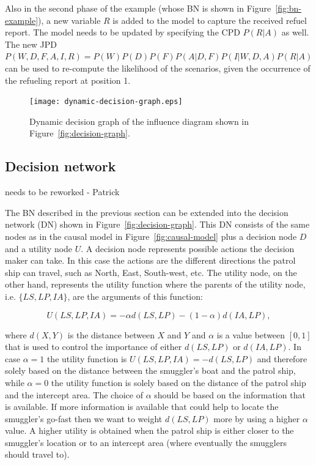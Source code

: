 \documentclass[conference]{IEEEtran}
\begin{document}
Also in the second phase of the example (whose BN is shown in Figure~\ref{fig:bn-example}), a new variable $R$ is added to the model to capture the received refuel report. The model needs to be updated by specifying the CPD $P(R|A)$ as well. The new JPD $P(W,D,F,A,I,R) = P(W)P(D)P(F)P(A|D,F)P(I|W,D,A)P(R|A)$ can be used to re-compute the likelihood of the scenarios, given the occurrence of the refueling report at position 1.


\begin{figure}[!t]
\begin{center}
 \texttt{[image: dynamic-decision-graph.eps]}
 \caption{Dynamic decision graph of the influence diagram shown in Figure~\ref{fig:decision-graph}.}
\end{center}
\end{figure}


\subsection{Decision network}

{\red needs to be reworked - Patrick}




The BN described in the previous section can be extended into the decision network (DN) shown in Figure~\ref{fig:decision-graph}. This DN consists of the same nodes as in the causal model in Figure~\ref{fig:causal-model} plus a decision node $D$ and a utility node $U$. A decision node represents possible actions the decision maker can take. In this case the actions are the different directions the patrol ship can travel, such as North, East, South-west, etc. The utility node, on the other hand, represents the utility function where the parents of the utility node, i.e. $\{LS,LP,IA\}$, are the arguments of this function:

\[
 U(LS,LP,IA) = -\alpha d(LS,LP) - (1-\alpha) d(IA,LP),
\]

where $d(X,Y)$ is the distance between $X$ and $Y$ and $\alpha$ is a value between $[0,1]$ that is used to control the importance of either $d(LS,LP)$ or $d(IA,LP)$. In case $\alpha=1$ the utility function is $U(LS,LP,IA) = -d(LS,LP)$ and therefore solely based on the distance between the smuggler's boat and the patrol ship, while $\alpha=0$ the utility function is solely based on the distance of the patrol ship and the intercept area. The choice of $\alpha$ should be based on the information that is available. If more information is available that could help to locate the smuggler's go-fast then we want to weight  $d(LS,LP)$ more by using a higher $\alpha$ value. A higher utility is obtained when the patrol ship is either closer to the smuggler's location or to an intercept area (where eventually the smugglers should travel to).
\end{document}
